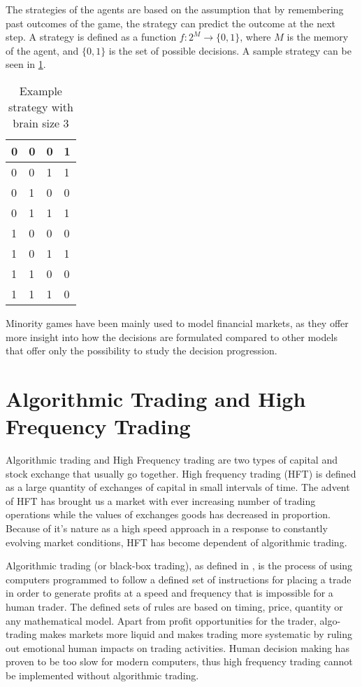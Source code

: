 The strategies of the agents are based on the assumption that by remembering past outcomes of the game, the strategy can predict the outcome at the next step.
A strategy is defined as a function $f:2^M\to\{0,1\}$, where $M$ is the memory of the agent, and $\{0,1\}$ is the set of possible decisions.
A sample strategy can be seen in \ref{table:minorityStrategy}.

\begin{table}
\centering
\begin{tabular}{|l|l|l||l|}
\hline
0 & 0 & 0 & 1   \\ \hline
0 & 0 & 1 & 1   \\ \hline
0 & 1 & 0 & 0   \\ \hline
0 & 1 & 1 & 1   \\ \hline
1 & 0 & 0 & 0   \\ \hline
1 & 0 & 1 & 1   \\ \hline
1 & 1 & 0 & 0   \\ \hline
1 & 1 & 1 & 0   \\ \hline
\end{tabular}
\caption{Example strategy with brain size 3}
\label{table:minorityStrategy}
\end{table}

Minority games have been mainly used to model financial markets, as they offer more insight into how the decisions are formulated compared to other models that offer only the possibility to study the decision progression.


\section{Algorithmic Trading and High Frequency Trading}
\label{1:finance}
Algorithmic trading and High Frequency trading are two types of capital and stock exchange that usually go together.
High frequency trading (HFT) is defined as a large quantity of exchanges of capital in small intervals of time.
The advent of HFT has brought us a market with ever increasing number of trading operations while the values of exchanges goods has decreased in proportion.
Because of it's nature as a high speed approach in a response to constantly evolving market conditions, HFT has become dependent of algorithmic trading.

Algorithmic trading (or black-box trading), as defined in \cite{algotrading}, is the process of using computers programmed to follow a defined set of instructions for placing a trade in order to generate profits at a speed and frequency that is impossible for a human trader. 
The defined sets of rules are based on timing, price, quantity or any mathematical model. 
Apart from profit opportunities for the trader, algo-trading makes markets more liquid and makes trading more systematic by ruling out emotional human impacts on trading activities.
Human decision making has proven to be too slow for modern computers, thus high frequency trading cannot be implemented without algorithmic trading. 

